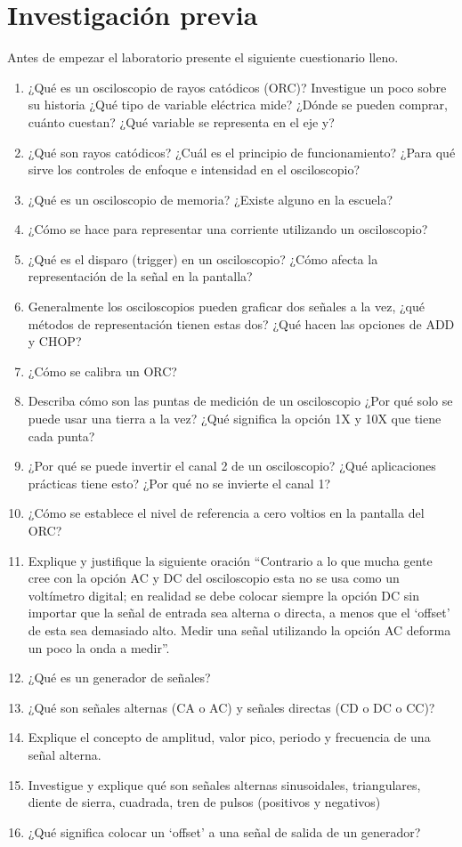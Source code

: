 \documentclass{report}
\newcommand{\inv}{Investigación previa}
\newcommand{\antesde}{Antes de empezar el laboratorio presente el siguiente cuestionario lleno.}
\begin{document}
\section{\inv}
\antesde
\begin{enumerate}
\item ¿Qué es un osciloscopio de rayos catódicos (ORC)? Investigue un poco
sobre su historia ¿Qué tipo de variable eléctrica mide? ¿Dónde se pueden
comprar, cuánto cuestan? ¿Qué variable se representa en el eje y?
\item ¿Qué son rayos catódicos? ¿Cuál es el principio de funcionamiento? ¿Para
qué sirve los controles de enfoque e intensidad en el osciloscopio?
\item ¿Qué es un osciloscopio de memoria? ¿Existe alguno en la escuela?
\item ¿Cómo se hace para representar una corriente utilizando un osciloscopio?
\item ¿Qué es el disparo (trigger) en un osciloscopio? ¿Cómo afecta la
representación de la señal en la pantalla?
\item Generalmente los osciloscopios pueden graficar dos señales a la vez, ¿qué
métodos de representación tienen estas dos? ¿Qué hacen las opciones de
ADD y CHOP?
\item ¿Cómo se calibra un ORC?
\item Describa cómo son las puntas de medición de un osciloscopio ¿Por qué solo
se puede usar una tierra a la vez? ¿Qué significa la opción 1X y 10X que
tiene cada punta?
\item ¿Por qué se puede invertir el canal 2 de un osciloscopio? ¿Qué aplicaciones
prácticas tiene esto? ¿Por qué no se invierte el canal 1?
\item ¿Cómo se establece el nivel de referencia a cero voltios en la pantalla del
ORC?
\item Explique y justifique la siguiente oración “Contrario a lo que mucha gente cree
con la opción AC y DC del osciloscopio esta no se usa como un voltímetro
digital; en realidad se debe colocar siempre la opción DC sin importar que la
señal de entrada sea alterna o directa, a menos que el ‘offset’ de esta sea
demasiado alto. Medir una señal utilizando la opción AC deforma un poco la
onda a medir”.
\item ¿Qué es un generador de señales?
\item ¿Qué son señales alternas (CA o AC) y señales directas (CD o DC o CC)?
\item Explique el concepto de amplitud, valor pico, periodo y frecuencia de una
señal alterna.
\item Investigue y explique qué son señales alternas sinusoidales, triangulares,
diente de sierra, cuadrada, tren de pulsos (positivos y negativos)
\item ¿Qué significa colocar un ‘offset’ a una señal de salida de un generador?
\end{enumerate}
\end{document}
